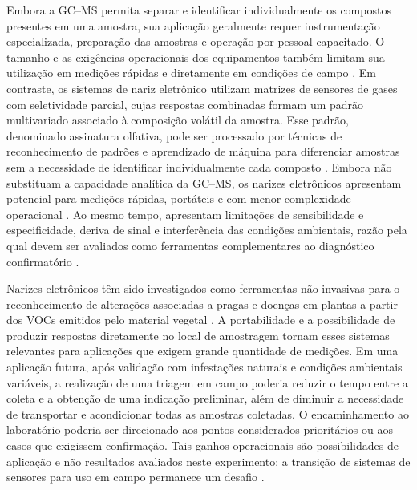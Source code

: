 Embora a GC--MS permita separar e identificar individualmente os compostos presentes em uma amostra, sua aplicação geralmente requer instrumentação especializada, preparação das amostras e operação por pessoal capacitado. O tamanho e as exigências operacionais dos equipamentos também limitam sua utilização em medições rápidas e diretamente em condições de campo \cite{banerji2024}. Em contraste, os sistemas de nariz eletrônico utilizam matrizes de sensores de gases com seletividade parcial, cujas respostas combinadas formam um padrão multivariado associado à composição volátil da amostra. Esse padrão, denominado assinatura olfativa, pode ser processado por técnicas de reconhecimento de padrões e aprendizado de máquina para diferenciar amostras sem a necessidade de identificar individualmente cada composto \cite{berna2010,li2024enose}. Embora não substituam a capacidade analítica da GC--MS, os narizes eletrônicos apresentam potencial para medições rápidas, portáteis e com menor complexidade operacional \cite{li2024enose}. Ao mesmo tempo, apresentam limitações de sensibilidade e especificidade, deriva de sinal e interferência das condições ambientais, razão pela qual devem ser avaliados como ferramentas complementares ao diagnóstico confirmatório \cite{cellini2017}.

Narizes eletrônicos têm sido investigados como ferramentas não invasivas para o reconhecimento de alterações associadas a pragas e doenças em plantas a partir dos VOCs emitidos pelo material vegetal \cite{cui2018,macdougall2022}. A portabilidade e a possibilidade de produzir respostas diretamente no local de amostragem tornam esses sistemas relevantes para aplicações que exigem grande quantidade de medições. Em uma aplicação futura, após validação com infestações naturais e condições ambientais variáveis, a realização de uma triagem em campo poderia reduzir o tempo entre a coleta e a obtenção de uma indicação preliminar, além de diminuir a necessidade de transportar e acondicionar todas as amostras coletadas. O encaminhamento ao laboratório poderia ser direcionado aos pontos considerados prioritários ou aos casos que exigissem confirmação. Tais ganhos operacionais são possibilidades de aplicação e não resultados avaliados neste experimento; a transição de sistemas de sensores para uso em campo permanece um desafio \cite{macdougall2022}.

